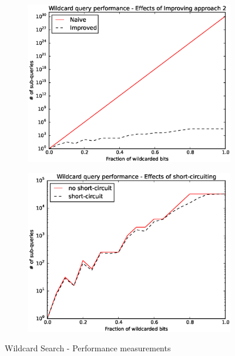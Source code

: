\documentclass[a4paper,11pt]{article}
\begin{document}
\begin{figure}[H]
\centering
\begin{subfigure}{.5\textwidth}
  \label{fig:w-query-performance}
  \centering
  \includegraphics[width=.95\linewidth]{work_over_wildcards_approaches}
  \caption{}
\end{subfigure}%
\begin{subfigure}{.5\textwidth}
  \label{fig:w-short-circuit}
  \centering
  \includegraphics[width=.95\linewidth]{work_over_wildcards_short-circuit}
  \caption{}
\end{subfigure}
  \caption{Wildcard Search - Performance measurements}
  \label{fig:w-perf}
\end{figure}
\end{document}
